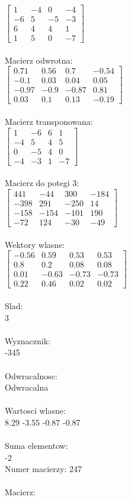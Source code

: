 \documentclass[a4paper,12pt]{article}
\begin{document}
$\begin{bmatrix} 1&-4&0&-4\\-6&5&-5&-3\\6&4&4&1\\1&5&0&-7 \end{bmatrix}$
\\
\\
Macierz odwrotna:\\

$\begin{bmatrix} 0.71&0.56&0.7&-0.54\\-0.1&0.03&0.04&0.05\\-0.97&-0.9&-0.87&0.81\\0.03&0.1&0.13&-0.19 \end{bmatrix}$
\\
\\
Macierz transponowana:\\

$\begin{bmatrix} 1&-6&6&1\\-4&5&4&5\\0&-5&4&0\\-4&-3&1&-7 \end{bmatrix}$
\\
\\
Macierz do potegi 3:\\

$\begin{bmatrix} 441&-44&300&-184\\-398&291&-250&14\\-158&-154&-101&190\\-72&124&-30&-49 \end{bmatrix}$
\\
\\
Wektory wlasne:\\

$\begin{bmatrix} -0.56&0.59&0.53&0.53\\0.8&0.2&0.08&0.08\\0.01&-0.63&-0.73&-0.73\\0.22&0.46&0.02&0.02 \end{bmatrix}$
\\
\\
Slad:\\
3
\\
\\
Wyznacznik:\\
-345
\\
\\
Odwracalnosc:\\
Odwracalna
\\
\\
Wartosci wlasne:\\
8.29 -3.55 -0.87 -0.87
\\
\\
Suma elementow:\\
-2
\\
\newpage
Numer macierzy:
247
\\
\\
Macierz:\\
\end{document}

